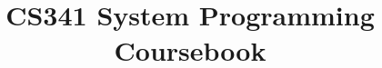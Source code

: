 \singlespacing
\title{\vspace{-15mm}\fontsize{24pt}{10pt}\selectfont\textbf{CS341 System Programming Coursebook}}
\date{}

\newcommand{\keyword}[1]{\underline{\smash{\textbf{\texttt{#1}}}}}
\newcommand{\todo}[1]{}
\renewcommand{\todo}[1]{{\color{red} TODO: {#1}}}
\providecommand{\tightlist}{\setlength{\itemsep}{0pt}\setlength{\parskip}{0pt}}

\newenvironment{proof}{\begin{shaded*}\paragraph{Proof:}}{\hfill$\square$\end{shaded*}}
\newenvironment{tableau}{\begin{shaded*}\begin{longtable}}{\end{longtable}\end{shaded*}}


\usepackage{csquotes}


\usepackage{float}


\renewcommand{\baselinestretch}{1.15}

